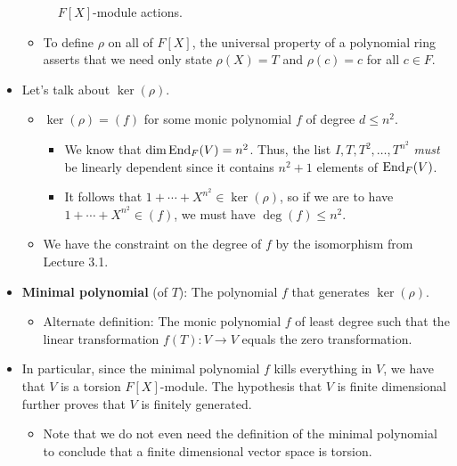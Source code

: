 \documentclass[../notes.tex]{subfiles}
\begin{document}
\begin{itemize}
\begin{figure}[H]
        \caption{$F[X]$-module actions.}
        \label{fig:fXmodAction}
    \end{figure}
    \begin{itemize}
        \item To define $\rho$ on all of $F[X]$, the universal property of a polynomial ring asserts that we need only state $\rho(X)=T$ and $\rho(c)=c$ for all $c\in F$.
    \end{itemize}
    \item Let's talk about $\ker(\rho)$.
    \begin{itemize}
        \item $\ker(\rho)=(f)$ for some monic polynomial $f$ of degree $d\leq n^2$.
        \begin{itemize}
            \item We know that $\dim\operatorname{End}_F(V)=n^2$. Thus, the list $I,T,T^2,\dots,T^{n^2}$ \emph{must} be linearly dependent since it contains $n^2+1$ elements of $\operatorname{End}_F(V)$.
            \item It follows that $1+\cdots+X^{n^2}\in\ker(\rho)$, so if we are to have $1+\cdots+X^{n^2}\in(f)$, we must have $\deg(f)\leq n^2$.
        \end{itemize}
        \item We have the constraint on the degree of $f$ by the isomorphism from Lecture 3.1.
    \end{itemize}
    \item \textbf{Minimal polynomial} (of $T$): The polynomial $f$ that generates $\ker(\rho)$.
    \begin{itemize}
        \item Alternate definition: The monic polynomial $f$ of least degree such that the linear transformation $f(T):V\to V$ equals the zero transformation.
    \end{itemize}
    \item In particular, since the minimal polynomial $f$ kills everything in $V$, we have that $V$ is a torsion $F[X]$-module. The hypothesis that $V$ is finite dimensional further proves that $V$ is finitely generated.
    \begin{itemize}
        \item Note that we do not even need the definition of the minimal polynomial to conclude that a finite dimensional vector space is torsion.

\end{itemize}
\end{itemize}
\end{document}
